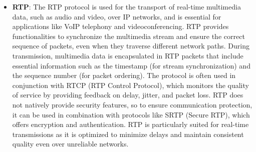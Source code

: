 \documentclass[english]{article}
\begin{document}
\begin{itemize}
	\item \textbf{\hypertarget{RTP}{RTP}}:
	      The RTP protocol is used for the transport of real-time multimedia data,
	      such as audio and video, over IP networks, and is essential for applications
	      like VoIP telephony and videoconferencing. RTP provides functionalities to
	      synchronize the multimedia stream and ensure the correct sequence of packets,
	      even when they traverse different network paths. During transmission,
	      multimedia data is encapsulated in RTP packets that include essential
	      information such as the timestamp (for stream synchronization) and the
	      sequence number (for packet ordering). The protocol is often used in
	      conjunction with RTCP (RTP Control Protocol), which monitors the quality
	      of service by providing feedback on delay, jitter, and packet loss.
	      RTP does not natively provide security features, so to ensure communication
	      protection, it can be used in combination with protocols like SRTP (Secure RTP),
	      which offers encryption and authentication. RTP is particularly suited for real-time
	      transmissions as it is optimized to minimize delays and maintain consistent quality
	      even over unreliable networks.


\end{itemize}
\end{document}
